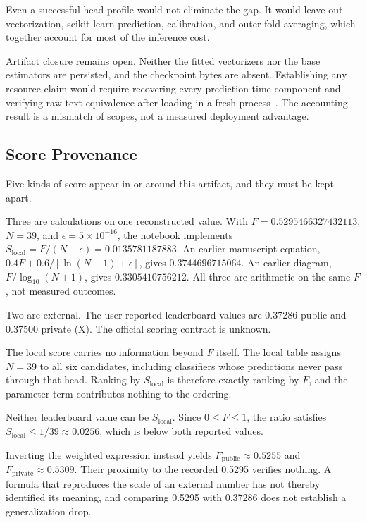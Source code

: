 \documentclass[runningheads]{llncs}
\begin{document}
Even a successful head profile would not eliminate the gap. It would leave out vectorization, scikit-learn prediction, calibration, and outer fold averaging, which together account for most of the inference cost.

Artifact closure remains open. Neither the fitted vectorizers nor the base estimators are persisted, and the checkpoint bytes are absent. Establishing any resource claim would require recovering every prediction time component and verifying raw text equivalence after loading in a fresh process~\cite{pineau2021reproducibility}. The accounting result is a mismatch of scopes, not a measured deployment advantage.

\subsection{Score Provenance}

Five kinds of score appear in or around this artifact, and they must be kept apart.

Three are calculations on one reconstructed value. With $F = 0.5295466327432113$, $N = 39$, and $\epsilon = 5 \times 10^{-16}$, the notebook implements $S_{\mathrm{local}} = F/(N + \epsilon) = 0.0135781187883$. An earlier manuscript equation, $0.4F + 0.6/[\ln(N+1) + \epsilon]$, gives $0.3744696715064$. An earlier diagram, $F/\log_{10}(N+1)$, gives $0.3305410756212$. All three are arithmetic on the same $F$, not measured outcomes.

Two are external. The user reported leaderboard values are 0.37286 public and 0.37500 private (X). The official scoring contract is unknown.

The local score carries no information beyond $F$ itself. The local table assigns $N = 39$ to all six candidates, including classifiers whose predictions never pass through that head. Ranking by $S_{\mathrm{local}}$ is therefore exactly ranking by $F$, and the parameter term contributes nothing to the ordering.

Neither leaderboard value can be $S_{\mathrm{local}}$. Since $0 \leq F \leq 1$, the ratio satisfies $S_{\mathrm{local}} \leq 1/39 \approx 0.0256$, which is below both reported values.

Inverting the weighted expression instead yields $F_{\mathrm{public}} \approx 0.5255$ and $F_{\mathrm{private}} \approx 0.5309$. Their proximity to the recorded 0.5295 verifies nothing. A formula that reproduces the scale of an external number has not thereby identified its meaning, and comparing 0.5295 with 0.37286 does not establish a generalization drop.
\end{document}
